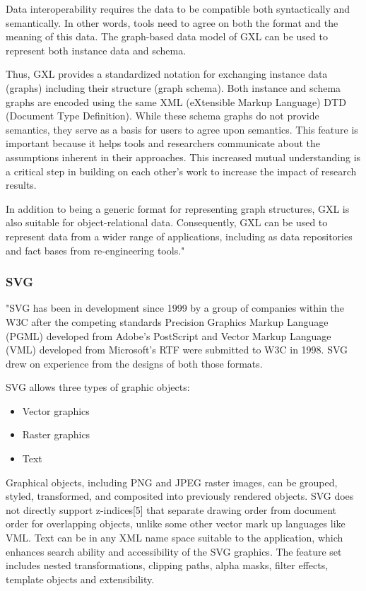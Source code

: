 Data interoperability requires the data to be compatible both syntactically and semantically. In other words, tools need to agree on both the format and the meaning of this data. The graph-based data model of GXL can be used to represent both instance data and schema.


Thus, GXL provides a standardized notation for exchanging instance data (graphs) including their structure (graph schema). Both instance and schema graphs are encoded using the same XML (eXtensible Markup Language) DTD (Document Type Definition). While these schema graphs do not provide semantics, they serve as a basis for users to agree upon semantics. This feature is important because it helps tools and researchers communicate about the assumptions inherent in their approaches. This increased mutual understanding is a critical step in building on each other's work to increase the impact of research results.


In addition to being a generic format for representing graph structures, GXL is also suitable for object-relational data. Consequently, GXL can be used to represent data from a wider range of applications, including as data repositories and fact bases from re-engineering tools."~\cite{GXL}

\subsubsection{SVG}
"SVG has been in development since 1999 by a group of companies within the W3C after the competing standards Precision Graphics Markup Language (PGML) developed from Adobe's PostScript and Vector Markup Language (VML) developed from Microsoft's RTF were submitted to W3C in 1998. SVG drew on experience from the designs of both those formats.


SVG allows three types of graphic objects:
\begin{itemize}
\item Vector graphics
\item Raster graphics
\item Text
\end{itemize}

Graphical objects, including PNG and JPEG raster images, can be grouped, styled, transformed, and composited into previously rendered objects. SVG does not directly support z-indices[5] that separate drawing order from document order for overlapping objects, unlike some other vector mark up languages like VML. Text can be in any XML name space suitable to the application, which enhances search ability and accessibility of the SVG graphics. The feature set includes nested transformations, clipping paths, alpha masks, filter effects, template objects and extensibility.


